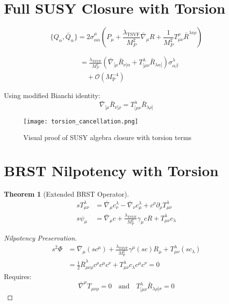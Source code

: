 \documentclass[12pt, onecolumn]{article}
\newtheorem{theorem}{Theorem}[section]
\theoremstyle{definition}
\newcommand{\tsvf}{\lambda_{\mathrm{TSVF}}}
\newcommand{\Mp}{M_{\mathrm{P}}}
\numberwithin{equation}{section}
\begin{document}
\appendix
\begin{appendices}


\section{Full SUSY Closure with Torsion}  
\label{app:torsion_closure}  

\begin{equation}  
\{Q_\alpha, \bar{Q}_{\dot{\alpha}}\} = 2\sigma^\mu_{\alpha\dot{\alpha}}\left(P_\mu + \frac{\tsvf}{M_P^2} \bar{\nabla}_\mu R + \frac{1}{M_P^2} T^\rho_{\mu\nu}\bar{R}^{\lambda\nu\rho}\right)
\end{equation}

\begin{align}  
[Q_\alpha, \{Q_\beta, A_\mu\}] &= \frac{\tsvf}{M_P^2}\left(\bar{\nabla}_{[\mu}\bar{R}_{\nu]\alpha} + T^\lambda_{[\mu\nu}\bar{R}_{\lambda\alpha]}\right)\sigma^\lambda_{\alpha\beta} \nonumber \\
&\quad + \mathcal{O}(\Mp^{-4})
\end{align}

\newpage
Using modified Bianchi identity:
\begin{equation}  
\bar{\nabla}_{[\mu}\bar{R}_{\nu]\rho} = T^\lambda_{[\mu\nu}\bar{R}_{\lambda\rho]}
\end{equation}

\begin{figure}[H]
\centering
\texttt{[image: torsion\_cancellation.png]}
\caption{Visual proof of SUSY algebra closure with torsion terms}
\label{fig:torsion_cancel}
\end{figure}

\section{BRST Nilpotency with Torsion}  
\label{app:brst_torsion}  

\begin{theorem}[Extended BRST Operator]
\begin{align}
s T^\lambda_{\mu\nu} &= \bar{\nabla}_\mu c^\lambda_\nu - \bar{\nabla}_\nu c^\lambda_\mu + c^\rho\partial_\rho T^\lambda_{\mu\nu} \\
s\psi_\mu &= \bar{\nabla}_\mu c + \frac{\tsvf}{\Mp^2}\gamma_\mu cR + T^\lambda_{\mu\nu}c_\lambda
\end{align}
\end{theorem}

\begin{proof}[Nilpotency Preservation]
\begin{align}
s^2\Phi &= \bar{\nabla}_\mu(sc^\mu) + \frac{\tsvf}{\Mp^2}\gamma^\mu(sc) R_\mu + T^\lambda_{\mu\nu}(sc_\lambda) \nonumber \\
&= \frac{1}{2}\bar{R}_{\mu\nu\rho}^\lambda c^\rho c^\mu c^\nu + T^\lambda_{\mu\nu}c_\lambda c^\mu c^\nu = 0
\end{align}
Requires:
\begin{equation}
\bar{\nabla}^\mu T_{\mu\nu\rho} = 0 \quad \text{and} \quad T_{[\mu\nu}^\lambda \bar{R}_{\lambda\rho]\sigma} = 0
\end{equation}
\end{proof}


\end{appendices}
\end{document}

